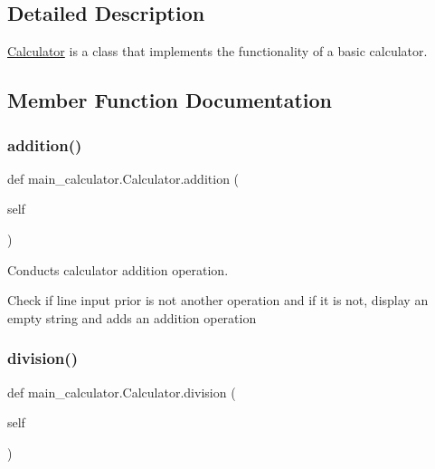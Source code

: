 \subsection{Detailed Description}
\hyperlink{classmain__calculator_1_1_calculator}{Calculator} is a class that implements the functionality of a basic calculator. 

\subsection{Member Function Documentation}
\mbox{\label{classmain__calculator_1_1_calculator_a7b20e7af5b1fdbd6061f6ea74b5b7a10}} 
\subsubsection{\texorpdfstring{addition()}{addition()}}
{\footnotesize\ttfamily def main\+\_\+calculator.\+Calculator.\+addition (\begin{DoxyParamCaption}\item[{}]{self }\end{DoxyParamCaption})}



Conducts calculator addition operation. 

Check if line input prior is not another operation and if it is not, display an empty string and adds an addition operation \mbox{\label{classmain__calculator_1_1_calculator_acd2ea45d8a2e83dc8b2b0f555d972898}} 
\subsubsection{\texorpdfstring{division()}{division()}}
{\footnotesize\ttfamily def main\+\_\+calculator.\+Calculator.\+division (\begin{DoxyParamCaption}\item[{}]{self }\end{DoxyParamCaption})}



